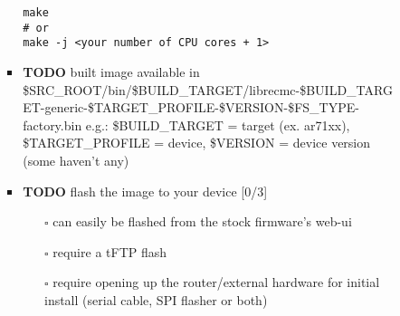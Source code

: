 \documentclass[a4paper]{report}
\begin{document}
\begin{itemize}
\begin{itemize}
\begin{itemize}
\begin{itemize}
\begin{verbatim}
make
# or
make -j <your number of CPU cores + 1>
\end{verbatim}
\item {\bfseries\sffamily TODO} built image available in
\label{sec:orgc24fb46}
\$SRC\_ROOT/bin/\$BUILD\_TARGET/librecmc-\$BUILD\_TARGET-generic-\$TARGET\_PROFILE-\$VERSION-\$FS\_TYPE-factory.bin
e.g.:
\$BUILD\_TARGET = target (ex. ar71xx), \$TARGET\_PROFILE = device, \$VERSION = device version (some haven't any)
\item {\bfseries\sffamily TODO} flash the image to your device [0/3]
\label{sec:org64c0e71}
\begin{itemize}
\item[{$\square$}] can easily be flashed from the stock firmware's web-ui
\item[{$\square$}] require a tFTP flash
\item[{$\square$}] require opening up the router/external hardware for initial install (serial cable, SPI flasher or both)
\end{itemize}
\end{itemize}
\end{itemize}
\end{itemize}
\end{itemize}
\end{document}
